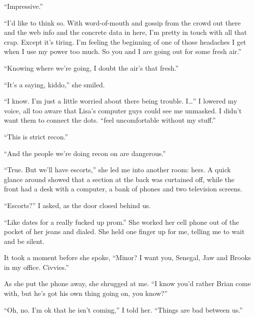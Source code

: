 ``Impressive.''



``I'd like to think so.  With word-of-mouth and gossip from the crowd out there and the web info and the concrete data in here, I'm pretty in touch with all that crap.  Except it's tiring.  I'm feeling the beginning of one of those headaches I get when I use my power too much.  So you and I are going out for some fresh air.''



``Knowing where we're going, I doubt the air's that fresh.''



``It's a saying, kiddo,'' she smiled.



``I know.  I'm just a little worried about there being trouble.  I\ldots'' I lowered my voice, all too aware that Lisa's computer guys could see me unmasked.  I didn't want them to connect the dots.  ``\ldotsjust feel uncomfortable without my stuff.''



``This is strict recon.''



``And the people we're doing recon on are dangerous.''



``True.  But we'll have escorts,'' she led me into another room: hers.  A quick glance around showed that a section at the back was curtained off, while the front had a desk with a computer, a bank of phones and two television screens.



``Escorts?'' I asked, as the door closed behind us.



``Like dates for a really fucked up prom.''  She worked her cell phone out of the pocket of her jeans and dialed. She held one finger up for me, telling me to wait and be silent.



It took a moment before she spoke, ``Minor?  I want you, Senegal, Jaw and Brooks in my office.  Civvies.''



As she put the phone away, she shrugged at me.  ``I know you'd rather Brian come with, but he's got his own thing going on, you know?''



``Oh, no.  I'm ok that he isn't coming,'' I told her.  ``Things are bad between us.''



